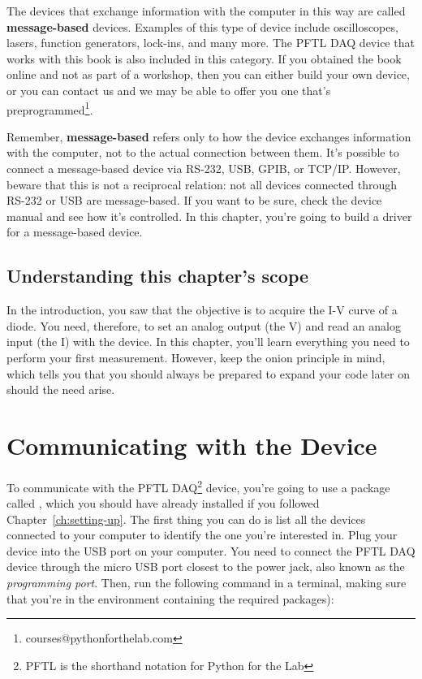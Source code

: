 The devices that exchange information with the computer in this way are called \textbf{message-based} devices. Examples of this type of device include oscilloscopes, lasers, function generators, lock-ins, and many more. The {PFTL DAQ} device that works with this book is also included in this category. If you obtained the book online and not as part of a workshop, then you can either build your own device, or you can contact us and we may be able to offer you one that's preprogrammed\footnote{courses@pythonforthelab.com}.


Remember, \textbf{message-based} refers only to how the device exchanges information with the computer, not to the actual connection between them. It's possible to connect a message-based device via RS-232, USB, GPIB, or TCP/IP. However, beware that this is not a reciprocal relation: not all devices connected through RS-232 or USB are message-based. If you want to be sure, check the device manual and see how it's controlled. In this chapter, you're going to build a driver for a message-based device.

\subsection{Understanding this chapter's scope}\label{subsec:scope-of-the-chapter}
In the introduction, you saw that the objective is to acquire the I-V curve of a diode. You need, therefore, to set an analog output (the V) and read an analog input (the I) with the device. In this chapter, you'll learn everything you need to perform your first measurement. However, keep the onion principle in mind, which tells you that you should always be prepared to expand your code later on should the need arise.

\section{Communicating with the Device}\label{sec:message-basedevices}
To communicate with the {PFTL DAQ}\footnote{PFTL is the shorthand notation for Python for the Lab} device, you're going to use a package called , which you should have already installed if you followed Chapter~\ref{ch:setting-up}. The first thing you can do is list all the devices connected to your computer to identify the one you're interested in. Plug your device into the USB port on your computer. You need to connect the {PFTL DAQ} device through the micro USB port closest to the power jack, also known as the \emph{programming port}. Then, run the following command in a terminal, making sure that you're in the environment containing the required packages):

